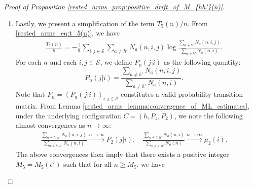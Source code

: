 \begin{proof}[Proof of Proposition \ref{rested_arms_prop:positive_drift_of_M_{hh'}(n)}]
\begin{enumerate}
    Noting that $h'\neq h$, when the underlying configuration is $C=(h,P_1,P_2)$, from Lemma \ref{rested_arms_lemma:convergence_of_ML_estimates}, we have the following almost sure convergences (as $n\to\infty$):
    \begingroup\allowdisplaybreaks\begin{align}
    	\frac{N_{h'}(n,i,j)}{n}&\to \mu_2(i)P_2(j|i),\nonumber\\
    	\frac{N_{h'}(n,i,j)}{N_{h'}(n,i)}&\to P_2(j|i).\label{rested_arms_eq:liminf_t_4(n)/n_2}
    \end{align}\endgroup
    Using these in \eqref{rested_arms_eq:liminf_t_4(n)/n_1}, we get that there exists a positive integer $M_4=M_4(\epsilon')$ such that for all $n\geq M_4$, we have
    \begingroup\allowdisplaybreaks\begin{align}
    	\frac{T_4(n)}{n}\geq \sum\limits_{i,j\in\mathcal{S}}(\mu_2(i)P_2(j|i)-\epsilon')\log\frac{1}{P_2(j|i)+\epsilon'}.\label{rested_arms_eq:liminf_t_4(n)/n_final}
    \end{align}\endgroup
    \item Lastly, we present a simplification of the term $T_5(n)/n$. From \eqref{rested_arms_eq:t_5(n)}, we have
    \begingroup\allowdisplaybreaks\begin{align}
    	\frac{T_5(n)}{n}=-\frac{1}{n}\sum\limits_{i,j\in\mathcal{S}}\sum\limits_{a\neq h'}N_{a}(n,i,j)\log\frac{\sum\limits_{a\neq h'}N_{a}(n,i,j)}{\sum\limits_{a\neq h'}N_{a}(n,i)}.\label{rested_arms_eq:liminf_t_5(n)/n_1}
    \end{align}\endgroup
    For each $n$ and each $i,j\in\mathcal{S}$, we define $P_n(j|i)$ as the following quantity:
    \begin{equation}
    	P_n(j|i)=\frac{\sum\limits_{a\neq h'}N_a(n,i,j)}{\sum\limits_{a\neq h'}N_a(n,i)}.\label{rested_arms_eq:P_n(j|i)}
    \end{equation}
    Note that $P_n=(P_n(j|i))_{i,j\in\mathcal{S}}$ constitutes a valid probability transition matrix. From Lemma \ref{rested_arms_lemma:convergence_of_ML_estimates}, under the underlying configuration $C=(h,P_1,P_2)$, we note the following almost convergences as $n\to\infty$:
    \begingroup\allowdisplaybreaks\begin{align}
    	\frac{\sum\limits_{a\neq h,h'}N_{a}(n,i,j)}{\sum\limits_{a\neq h,h'}N_{a}(n,i)}\stackrel{n\to\infty}{\longrightarrow} P_2(j|i),\quad
  	\frac{\sum\limits_{a\neq h,h'}N_{a}(n,i)}{\sum\limits_{a\neq h,h'}N_{a}(n)}\stackrel{n\to\infty}{\longrightarrow} \mu_2(i).
    \end{align}\endgroup
    The above convergences then imply that there exists a positive integer $M_5=M_5(\epsilon')$ such that for all $n\geq M_5$, we have

\end{enumerate}
\end{proof}
